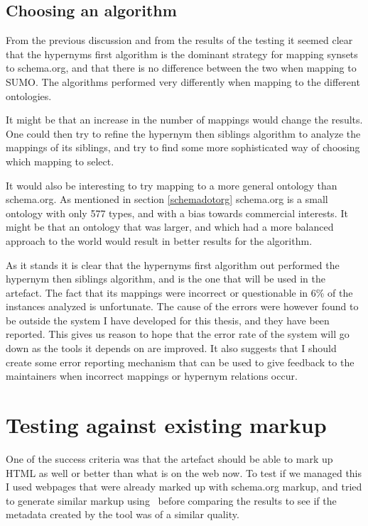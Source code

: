 \subsection{Choosing an algorithm}
From the previous discussion and from the results of the testing it seemed clear that the hypernyms first algorithm is
the dominant strategy for mapping synsets to schema.org, and that there is no difference between the two when mapping to SUMO.
The algorithms performed very differently when mapping to the different ontologies.

It might be that an increase in the number of mappings would change the results.
One could then try to refine the hypernym then siblings algorithm to analyze the mappings of its siblings,
and try to find some more sophisticated way of choosing which mapping to select.

It would also be interesting to try mapping to a more general ontology than schema.org.
As mentioned in section \ref{schemadotorg} schema.org is a small ontology with only 577 types,
and with a bias towards commercial interests.
It might be that an ontology that was larger,
and which had a more balanced approach to the world would result in better results for the algorithm.

As it stands it is clear that the hypernyms first algorithm out performed the hypernym then siblings algorithm,
and is the one that will be used in the artefact.
The fact that its mappings were incorrect or questionable in 6\% of the instances analyzed is unfortunate.
The cause of the errors were however found to be outside the system I have developed for this thesis,
and they have been reported.
This gives us reason to hope that the error rate of the system will go down as the tools it depends on are improved.
It also suggests that I should create some error reporting mechanism that can be used to give feedback to the maintainers
when incorrect mappings or hypernym relations occur.


\section{Testing against existing markup}
One of the success criteria was that the artefact should be able to mark up HTML as well or better than what is on the web now.
To test if we managed this I used webpages that were already marked up with schema.org markup,
and tried to generate similar markup using \theartefact\ before comparing the results to see if the metadata created
by the tool was of a similar quality.

